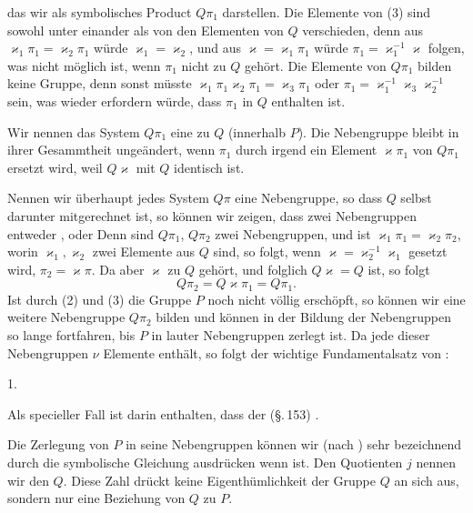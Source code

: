 das wir als symbolisches Product $Q\pi_1$ darstellen. Die Elemente
von (3) sind sowohl unter einander als von den Elementen von
$Q$ verschieden, denn aus $\varkappa_1\pi_1 = \varkappa_2\pi_1$ würde $\varkappa_1 = \varkappa_2$, und aus
$\varkappa = \varkappa_1\pi_1$ würde $\pi_1 = \varkappa_1^{-1}\varkappa$ folgen, was nicht möglich ist, wenn
$\pi_1$ nicht zu $Q$ gehört. Die Elemente von $Q\pi_1$ bilden keine
Gruppe, denn sonst müsste $\varkappa_1\pi_1\varkappa_2\pi_1 = \varkappa_3\pi_1$ oder $\pi_1 = \varkappa_1^{-1}\varkappa_3\varkappa_2^{-1}$
sein, was wieder erfordern würde, dass $\pi_1$ in $Q$ enthalten ist.

Wir nennen das System $Q\pi_1$ eine  zu $Q$
(innerhalb $P$). Die Nebengruppe bleibt in ihrer Gesammtheit
ungeändert, wenn $\pi_1$ durch irgend ein Element $\varkappa\pi_1$ von $Q\pi_1$
ersetzt wird, weil $Q\varkappa$ mit $Q$ identisch ist.

Nennen wir überhaupt jedes System $Q\pi$ eine Nebengruppe,
so dass $Q$ selbst darunter mitgerechnet ist, so können wir zeigen,
dass zwei Nebengruppen entweder , oder
 Denn sind $Q\pi_1$,
$Q\pi_2$ zwei Nebengruppen, und ist $\varkappa_1\pi_1 = \varkappa_2\pi_2$, worin $\varkappa_1, \varkappa_2$ zwei
Elemente aus $Q$ sind, so folgt, wenn $\varkappa = \varkappa_2^{-1}\varkappa_1$ gesetzt wird,
$\pi_2 = \varkappa\pi$. Da aber $\varkappa$ zu $Q$ gehört, und folglich $Q\varkappa = Q$ ist,
so folgt
\[
Q\pi_2 = Q\varkappa\pi_1 = Q\pi_1.
\]
Ist durch (2) und (3) die Gruppe $P$ noch nicht völlig erschöpft, so können wir eine weitere Nebengruppe $Q\pi_2$ bilden
und können in der Bildung der Nebengruppen so lange fortfahren, bis $P$ in lauter Nebengruppen zerlegt ist. Da jede dieser
Nebengruppen $\nu$ Elemente enthält, so folgt der wichtige Fundamentalsatz von :

1. 

Als specieller Fall ist darin enthalten, dass der  (\S.\,153) .

Die Zerlegung von $P$ in seine Nebengruppen können wir
(nach ) sehr bezeichnend durch die symbolische Gleichung
ausdrücken
wenn
ist. Den Quotienten $j$ nennen wir den 
$Q$. Diese Zahl drückt keine Eigenthümlichkeit der Gruppe $Q$
an sich aus, sondern nur eine Beziehung von $Q$ zu $P$.
